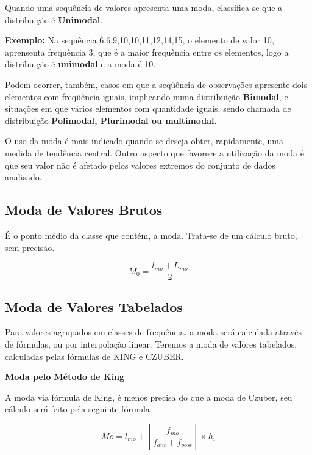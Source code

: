 Quando uma sequência de valores apresenta uma moda, classifica-se que a distribuição é \textbf{Unimodal}.\vskip0.3cm


\textbf{Exemplo:} Na sequência 6,6,9,10,10,11,12,14,15, o elemento de valor 10, aprensenta frequência 3, que é a maior frequência entre os elementos, logo a distribuição é \textbf{unimodal} e a moda é 10.\vskip0.3cm

Podem ocorrer, também, casos em que a seqüência de observações apresente dois elementos com freqüência iguais, implicando numa distribuição \textbf{Bimodal}, e situações em que vários elementos com quantidade iguais, sendo chamada de distribuição \textbf{Polimodal, Plurimodal ou multimodal}.\vskip0.3cm

O uso da moda é mais indicado quando se deseja obter, rapidamente, uma medida de tendência central. Outro aspecto que favorece a utilização da moda é que seu valor não é afetado pelos valores extremos do conjunto de dados analisado.\vskip0.3cm

\subsection{Moda de Valores Brutos}

\vskip0.3cm


É o ponto médio da classe que contém, a moda. Trata-se de um cálculo bruto, sem precisão.

\begin{equation}\label{}
    M_{0}= \frac{l_{mo}+L_{mo}}{2}
\end{equation}


\subsection{Moda de Valores Tabelados}

\vskip0.3cm

Para valores agrupados em classes de frequência, a moda será calculada através de fórmulas, ou por interpolação linear. Teremos a moda de valores tabelados, calculadas pelas fórmulas de KING e CZUBER.
\vskip0.3cm


\textbf{Moda pelo Método de King}
\vskip0.3cm

A moda via fórmula de King, é menos precisa do que a moda de Czuber, seu cálculo será feito pela seguinte fórmula.


\begin{equation}\label{}
    Mo=l_{mo}+\left[\frac{f_{mo}}{f_{ant}+f_{post}}\right]\times h_{i}
\end{equation}

